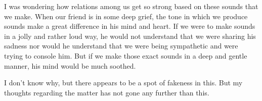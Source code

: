 \documentclass[twoside,11pt]{article}
\begin{document}
I was wondering how relations among us get so strong based on these sounds that we make. When our friend is in some deep grief, the tone in which we produce sounds make a great difference in his mind and heart. If we were to make sounds in a jolly and rather loud way, he would not understand that we were sharing his sadness nor would he understand that we were being sympathetic and were trying to console him. But if we make those exact sounds in a deep and gentle manner, his mind would be much soothed.

I don't know why, but there appears to be a spot of fakeness in this. But my thoughts regarding the matter has not gone any further than this.
\end{document}
